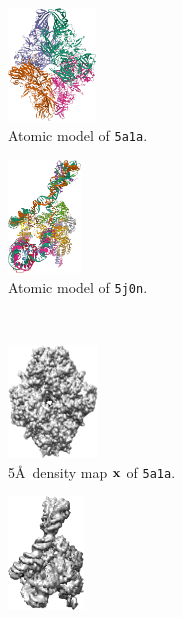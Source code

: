 \begin{figure}[ht!]
    \centering
    \begin{minipage}[b]{0.50\linewidth}
        \centering
        \begin{subfigure}[b]{0.49\linewidth}
            \centering
            \includegraphics[height=3cm]{figures/5a1a_pdb.png}
            \caption{Atomic model of \texttt{5a1a}.}
        \end{subfigure}
        \hfill
        \begin{subfigure}[b]{0.49\linewidth}
            \centering
            \includegraphics[height=3cm]{figures/5j0n_pdb.png}
            \caption{Atomic model of \texttt{5j0n}.}
        \end{subfigure}
        \\ \vspace{0.5em}
        \begin{subfigure}[b]{0.49\linewidth}
            \centering
            \includegraphics[height=3cm]{figures/5a1a_5A_.png}
            \caption{5\AA\ density map $\mathbf{x}$ of \texttt{5a1a}.}%
            \label{fig:density-map:5j0n:ground-truth}
        \end{subfigure}
        \hfill
        \begin{subfigure}[b]{0.49\linewidth}
            \centering
            \includegraphics[height=3cm]{figures/5j0n_5A_.png}

\end{subfigure}
\end{minipage}
\end{figure}
